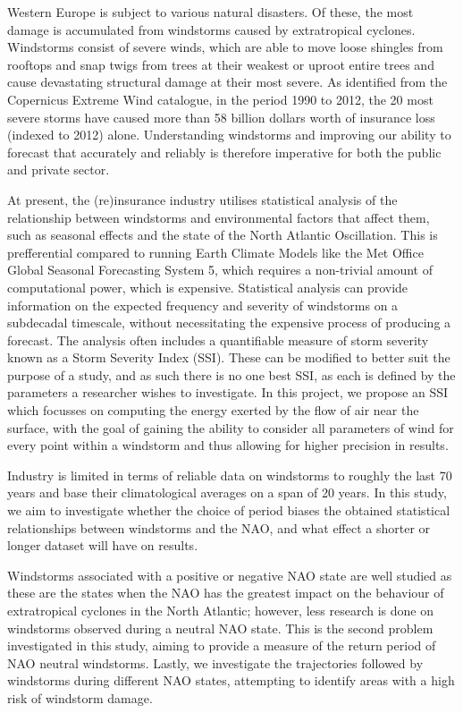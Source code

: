 

Western Europe is subject to various natural disasters. Of these, the most damage is accumulated from windstorms caused by extratropical cyclones. Windstorms consist of severe winds, which are able to move loose shingles from rooftops and snap twigs from trees at their weakest or uproot entire trees and cause devastating structural damage at their most severe. As identified from the Copernicus Extreme Wind catalogue, in the period 1990 to 2012, the 20 most severe storms have caused more than 58 billion dollars worth of insurance loss (indexed to 2012) alone. Understanding windstorms and improving our ability to forecast that accurately and reliably is therefore imperative for both the public and private sector.

At present, the (re)insurance industry utilises statistical analysis of the relationship between windstorms and environmental factors that affect them, such as seasonal effects and the state of the North Atlantic Oscillation. This is prefferential compared to running Earth Climate Models like the Met Office Global Seasonal Forecasting System 5, which requires a non-trivial amount of computational power, which is expensive. Statistical analysis can provide information on the expected frequency and severity of windstorms on a subdecadal timescale, without necessitating the expensive process of producing a forecast. The analysis often includes a quantifiable measure of storm severity known as a Storm Severity Index (SSI). These can be modified to better suit the purpose of a study, and as such there is no one best SSI, as each is defined by the parameters a researcher wishes to investigate.
In this project, we propose an SSI which focusses on computing the energy exerted by the flow of air near the surface, with the goal of gaining the ability to consider all parameters of wind for every point within a windstorm and thus allowing for higher precision in results.

Industry is limited in terms of reliable data on windstorms to roughly the last 70 years and base their climatological averages on a span of 20 years. In this study, we aim to investigate whether the choice of period biases the obtained statistical relationships between windstorms and the NAO, and what effect a shorter or longer dataset will have on results.

Windstorms associated with a positive or negative NAO state are well studied as these are the states when the NAO has the greatest impact on the behaviour of extratropical cyclones in the North Atlantic; however, less research is done on windstorms observed during a neutral NAO state. This is the second problem investigated in this study, aiming to provide a measure of the return period of NAO neutral windstorms. 
Lastly, we investigate the trajectories followed by windstorms during different NAO states, attempting to identify areas with a high risk of windstorm damage.